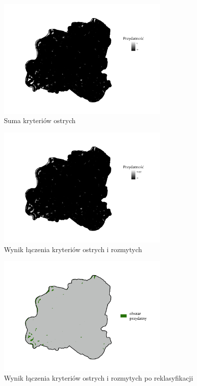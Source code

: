 \documentclass{article}
\begin{document}
\begin{figure}[H]
    \centering
    \includegraphics[width=0.75\textwidth]{img/plesna-ostre-layout.jpg}
    \caption*{Suma kryteriów ostrych}
\end{figure}

\begin{figure}[H]
    \centering
    \includegraphics[width=0.75\textwidth]{img/plesna-wynik.jpg}
    \caption*{Wynik łączenia kryteriów ostrych i rozmytych}
\end{figure}

\begin{figure}[H]
    \centering
    \includegraphics[width=0.75\textwidth]{img/plesna-wynik-po-reklasyfikacji.jpg}
    \caption*{Wynik łączenia kryteriów ostrych i rozmytych po reklasyfikacji}
\end{figure}
\end{document}
